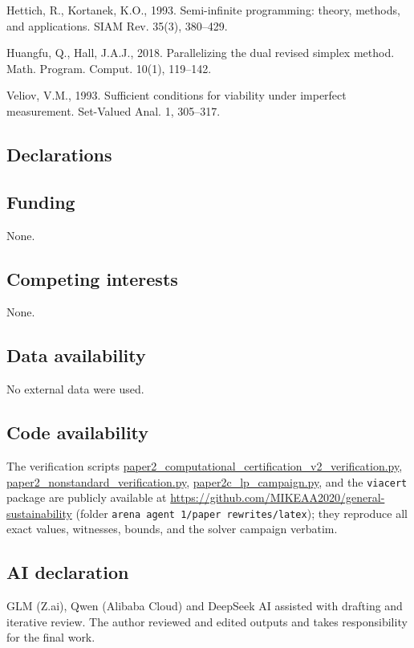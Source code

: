 \documentclass[10pt,twocolumn]{article}
\theoremstyle{plain}
\theoremstyle{definition}
\theoremstyle{remark}
\begin{document}
Hettich, R., Kortanek, K.O., 1993. Semi-infinite programming: theory,
methods, and applications. SIAM Rev. 35(3), 380--429.

Huangfu, Q., Hall, J.A.J., 2018. Parallelizing the dual revised simplex
method. Math. Program. Comput. 10(1), 119--142.

Veliov, V.M., 1993. Sufficient conditions for viability under imperfect
measurement. Set-Valued Anal. 1, 305--317.

\subsection*{Declarations}

\subsection*{Funding}
None.

\subsection*{Competing interests}
None.

\subsection*{Data availability}
No external data were used.

\subsection*{Code availability}
The verification scripts \url{paper2_computational_certification_v2_verification.py},
\url{paper2_nonstandard_verification.py},
\url{paper2c_lp_campaign.py}, and the \texttt{viacert} package are publicly
available at \url{https://github.com/MIKEAA2020/general-sustainability}
(folder \texttt{arena agent 1/paper rewrites/latex}); they reproduce all
exact values, witnesses, bounds, and the solver campaign verbatim.

\subsection*{AI declaration}
GLM (Z.ai), Qwen (Alibaba Cloud) and DeepSeek AI assisted with drafting
and iterative review. The author reviewed and edited outputs and takes
responsibility for the final work.
\end{document}
